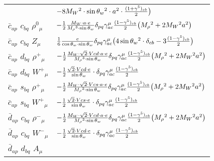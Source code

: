 \begin{center}
\begin{tabular}{|l|l|}
  & $-8 M_W{}^2 \cdot  \sin{\theta}_w{}^2 \cdot  a{}^2 \cdot {(1+\gamma^5)_{c b}\over 2} \big)$\\[2mm]
$\bar{c}{}_{a p }$ \phantom{-} $c{}_{b q }$ \phantom{-} $\rho^0{}_{\mu }$ \phantom{-}  &
	$-\frac{1}{2}\frac{ M_W \cdot a \cdot e}{ M_\rho{}^3  \cdot \sin{\theta}_w}\delta_{p q} \gamma_{a c}^\mu {(1-\gamma^5)_{c b}\over 2} \big( M_\rho{}^2 +2 M_W{}^2  a{}^2 \big)$\\[2mm]
$\bar{c}{}_{a p }$ \phantom{-} $c{}_{b q }$ \phantom{-} ${Z}_{\mu }$ \phantom{-}  &
	$\frac{1}{6}\frac{ e}{ \cos{\theta}_w \cdot \sin{\theta}_w}\delta_{p q} \gamma_{a c}^\mu \big(4 \sin{\theta}_w{}^2 \cdot \delta_{c b} -3{(1-\gamma^5)_{c b}\over 2} \big)$\\[2mm]
$\bar{c}{}_{a p }$ \phantom{-} $d{}_{b q }$ \phantom{-} $\rho^+{}_{\mu }$ \phantom{-}  &
	$-\frac{1}{2}\frac{ M_W \cdot\sqrt{2} \cdot Vcd \cdot a \cdot e}{ M_\rho{}^3  \cdot \sin{\theta}_w}\delta_{p q} \gamma_{a c}^\mu {(1-\gamma^5)_{c b}\over 2} \big( M_\rho{}^2 +2 M_W{}^2  a{}^2 \big)$\\[2mm]
$\bar{c}{}_{a p }$ \phantom{-} $d{}_{b q }$ \phantom{-} $W^+{}_{\mu }$ \phantom{-}  &
	$-\frac{1}{2}\frac{\sqrt{2} \cdot Vcd \cdot e}{ \sin{\theta}_w}\cdot \delta_{p q} \gamma_{a c}^\mu {(1-\gamma^5)_{c b}\over 2} $\\[2mm]
$\bar{c}{}_{a p }$ \phantom{-} $s{}_{b q }$ \phantom{-} $\rho^+{}_{\mu }$ \phantom{-}  &
	$-\frac{1}{2}\frac{ M_W \cdot\sqrt{2} \cdot Vcs \cdot a \cdot e}{ M_\rho{}^3  \cdot \sin{\theta}_w}\delta_{p q} \gamma_{a c}^\mu {(1-\gamma^5)_{c b}\over 2} \big( M_\rho{}^2 +2 M_W{}^2  a{}^2 \big)$\\[2mm]
$\bar{c}{}_{a p }$ \phantom{-} $s{}_{b q }$ \phantom{-} $W^+{}_{\mu }$ \phantom{-}  &
	$-\frac{1}{2}\frac{\sqrt{2} \cdot Vcs \cdot e}{ \sin{\theta}_w}\cdot \delta_{p q} \gamma_{a c}^\mu {(1-\gamma^5)_{c b}\over 2} $\\[2mm]
$\bar{d}{}_{a p }$ \phantom{-} $c{}_{b q }$ \phantom{-} $\rho^-{}_{\mu }$ \phantom{-}  &
	$-\frac{1}{2}\frac{ M_W \cdot\sqrt{2} \cdot Vcd \cdot a \cdot e}{ M_\rho{}^3  \cdot \sin{\theta}_w}\delta_{p q} \gamma_{a c}^\mu {(1-\gamma^5)_{c b}\over 2} \big( M_\rho{}^2 +2 M_W{}^2  a{}^2 \big)$\\[2mm]
$\bar{d}{}_{a p }$ \phantom{-} $c{}_{b q }$ \phantom{-} $W^-{}_{\mu }$ \phantom{-}  &
	$-\frac{1}{2}\frac{\sqrt{2} \cdot Vcd \cdot e}{ \sin{\theta}_w}\cdot \delta_{p q} \gamma_{a c}^\mu {(1-\gamma^5)_{c b}\over 2} $\\[2mm]
$\bar{d}{}_{a p }$ \phantom{-} $d{}_{b q }$ \phantom{-} ${A}_{\mu }$ \phantom{-}  &

\end{tabular}
\end{center}
